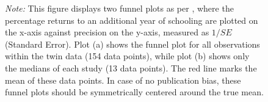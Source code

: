 \begin{figure}[!htbp]
\begin{center}
\begin{subfigure}[b]{0.45\textwidth}
            \label{fig:funnel_plot_twins_medians}
        \end{subfigure}
    \end{center}\vspace{-0.6cm}
    \captionsetup{width=0.85\textwidth, font = scriptsize}
    \caption*{\emph{Note:} This figure displays two funnel plots as per \cite{Egger1997}, where the percentage returns to an additional year of schooling are plotted on the x-axis against precision on the y-axis, measured as $1/SE$ (Standard Error). Plot (a) shows the funnel plot for all observations within the twin data (154 data points), while plot (b) shows only the medians of each study (13 data points). The red line marks the mean of these data points. In case of no publication bias, these funnel plots should be symmetrically centered around the true mean.}
\end{figure}


